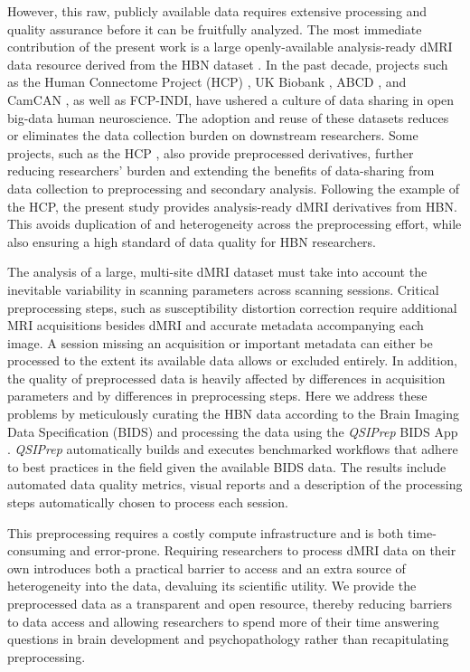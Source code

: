 \documentclass[fleqn,10pt,inline]{wlscirep}
\begin{document}
However, this raw, publicly available data requires extensive processing and quality assurance before it can be fruitfully analyzed.
The most immediate contribution of the present work is a large openly-available analysis-ready dMRI data resource derived from the HBN dataset . In the past decade, projects such as the Human Connectome Project (HCP) \cite{van-essen2013-oi}, UK Biobank
\cite{miller2016-mq}, ABCD \cite{jernigan2018-my}, and CamCAN
\cite{taylor2017-or,shafto2014-ld}, as well as FCP-INDI, have ushered a culture of data sharing in open big-data
human neuroscience. The adoption and reuse of these datasets reduces or eliminates the
data collection burden on downstream researchers. Some projects, such as the HCP
\cite{glasser2013-lo}, also provide preprocessed derivatives, further reducing
researchers' burden and extending the benefits of data-sharing from data
collection to preprocessing and secondary analysis. Following the example of the
HCP, the present study provides analysis-ready dMRI derivatives from HBN. This avoids duplication
of and heterogeneity across the preprocessing effort, while also ensuring a high standard of data quality
for HBN researchers.

The analysis of a large, multi-site dMRI dataset must take into account the inevitable variability
in scanning parameters across scanning sessions.
Critical preprocessing steps, such as susceptibility 
distortion correction \cite{jones2010-ps} require additional MRI acquisitions besides dMRI and accurate metadata accompanying each
image.
A session missing an acquisition or important metadata can either be processed to the extent 
its available data allows or excluded entirely.
In addition, the quality of preprocessed data is heavily affected by 
differences in acquisition parameters \cite{yeh2019-kb} and by differences in preprocessing
steps.
Here we address these problems by meticulously curating
the HBN data according to the Brain Imaging Data Specification (BIDS)
\cite{gorgolewski2016-lh} and processing the data using the \emph{QSIPrep} \cite{cieslak2021-iq} 
BIDS App \cite{Gorgolewski2017-mb}. \emph{QSIPrep} automatically builds and executes
benchmarked workflows that adhere to best practices in the field
given the available BIDS data. The results include automated
data quality metrics, visual reports and a description of the processing steps automatically chosen to process
each session.

This preprocessing requires a costly compute infrastructure and is both time-consuming and error-prone. Requiring researchers to process dMRI data on their own introduces both a practical barrier to access and an extra source of heterogeneity into the data, devaluing its scientific utility. We provide the preprocessed data as a transparent and open resource, thereby reducing barriers to data access and allowing researchers to spend more of their time answering questions in brain development and psychopathology rather than recapitulating preprocessing.
\end{document}
